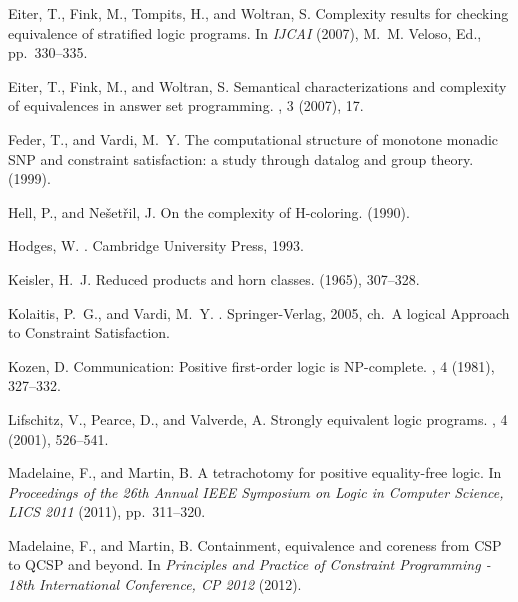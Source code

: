 \documentclass{LMCS}
\begin{document}
\begin{thebibliography}{10}
{\sc Eiter, T., Fink, M., Tompits, H., and Woltran, S.}
\newblock Complexity results for checking equivalence of stratified logic
  programs.
\newblock In {\em IJCAI\/} (2007), M.~M. Veloso, Ed., pp.~330--335.

{\sc Eiter, T., Fink, M., and Woltran, S.}
\newblock Semantical characterizations and complexity of equivalences in answer
  set programming.
, 3 (2007), 17.

{\sc Feder, T., and Vardi, M.~Y.}
\newblock The computational structure of monotone monadic {SNP} and constraint
  satisfaction: a study through datalog and group theory.
 (1999).

{\sc Hell, P., and Ne\v{s}et\v{r}il, J.}
\newblock On the complexity of {H}-coloring.
 (1990).

{\sc Hodges, W.}
.
\newblock Cambridge University Press, 1993.

{\sc Keisler, H.~J.}
\newblock Reduced products and horn classes.
 (1965), 307--328.

{\sc Kolaitis, P.~G., and Vardi, M.~Y.}
.
\newblock Springer-Verlag, 2005, ch.~A logical Approach to Constraint
  Satisfaction.

{\sc Kozen, D.}
\newblock Communication: Positive first-order logic is {NP}-complete.
, 4 (1981), 327--332.

{\sc Lifschitz, V., Pearce, D., and Valverde, A.}
\newblock Strongly equivalent logic programs.
, 4 (2001), 526--541.

{\sc Madelaine, F., and Martin, B.}
\newblock A tetrachotomy for positive equality-free logic.
\newblock In {\em Proceedings of the 26th Annual IEEE Symposium on Logic in
  Computer Science, LICS 2011\/} (2011), pp.~311--320.

{\sc Madelaine, F., and Martin, B.}
\newblock Containment, equivalence and coreness from {CSP} to {QCSP} and
  beyond.
\newblock In {\em Principles and Practice of Constraint Programming - 18th
  International Conference, CP 2012\/} (2012).


\end{thebibliography}
\end{document}
